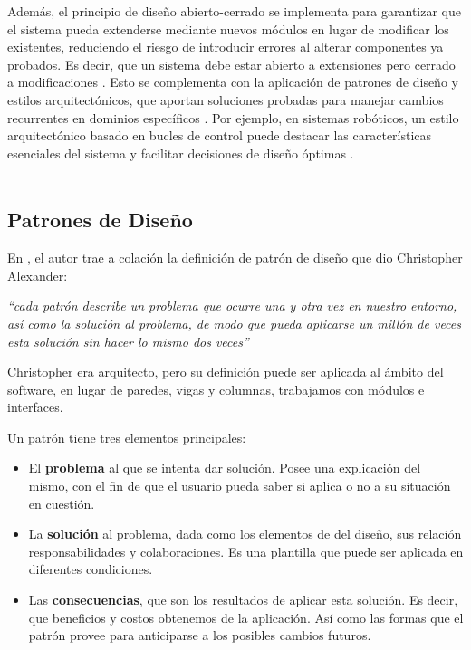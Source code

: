 Además, el principio de diseño abierto-cerrado \cite{DBLP:books/ph/Meyer97} se implementa para garantizar que el sistema pueda extenderse mediante nuevos módulos en lugar de modificar los existentes, reduciendo el riesgo de introducir errores al alterar componentes ya probados. Es decir, que un sistema debe estar abierto a extensiones pero cerrado a modificaciones \cite{DBLP:books/ph/Meyer97}. Esto se complementa con la aplicación de patrones de diseño y estilos arquitectónicos, que aportan soluciones probadas para manejar cambios recurrentes en dominios específicos \cite{Gamma:1995:DPE:186897, DBLP:books/lib/BuschmannHS07}. Por ejemplo, en sistemas robóticos, un estilo arquitectónico basado en bucles de control puede destacar las características esenciales del sistema y facilitar decisiones de diseño óptimas \cite{ShawGarlan1996}.
\\\\
\noindent{} 


\subsection{Patrones de Diseño}

En \cite{Gamma:1995:DPE:186897}, el autor trae a colación la definición de patrón de diseño que dio Christopher Alexander:

\textit{``cada patrón describe un problema que ocurre una y otra vez en nuestro entorno, así como la solución al problema, de modo que pueda aplicarse un millón de veces esta solución sin hacer lo mismo dos veces''}

Christopher era arquitecto, pero su definición puede ser aplicada al ámbito del software, en lugar de paredes, vigas y columnas, trabajamos con módulos e interfaces.

Un patrón tiene tres elementos principales:

\begin{itemize}
	\item El \textbf{problema} al que se intenta dar solución. Posee una explicación del mismo, con el fin de que el usuario pueda saber si aplica o no a su situación en cuestión.
	\item La \textbf{solución} al problema, dada como los elementos de del diseño, sus relación responsabilidades y colaboraciones. Es una plantilla que puede ser aplicada en diferentes condiciones.
	\item Las \textbf{consecuencias}, que son los resultados de aplicar esta solución. Es decir, que beneficios y costos obtenemos de la aplicación. Así como las formas que el patrón provee para anticiparse a los posibles cambios futuros.
\end{itemize}

